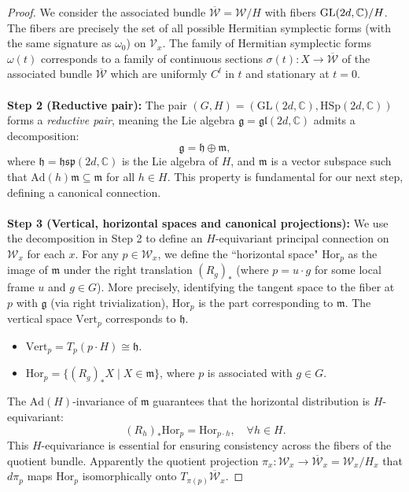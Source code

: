 \documentclass[11pt]{amsart}
\theoremstyle{remark}
\theoremstyle{definition}
\newcommand{\C}{{\mathbf C}}
\newcommand{\V}{{\mathbf V}}
\newcommand{\W}{{\mathbf W}}
\newcommand{\GL}{{\rm GL}}
\def \W{{\mathcal W}}
\def \C{{\mathcal{C}}}
\def \W{\mathcal{W}}
\def \V{\mathcal{V}}
\def\C{{\mathbb C}}
\begin{document}
\begin{proof}
We consider the associated bundle $\overline{\mathcal{W}} = \mathcal{W} / H$ with fibers $\GL(2d,\C)/H$. The fibers are precisely the set of all possible Hermitian symplectic forms (with the same signature as $\omega_0$) on $\V_x$. 
The family of Hermitian symplectic forms $\omega(t)$ corresponds to a family of continuous sections $\sigma(t): X \to \overline{\mathcal{W}}$ of the associated bundle $\overline{\W}$ which are uniformly $C^l$ in $t$ and stationary at $t=0$. 
\\
\\ \textbf{Step 2 (Reductive pair): } The pair $(G, H) = (\text{GL}(2d, \mathbb{C}), \text{HSp}(2d, \mathbb{C}))$ forms a \textit{reductive pair}, meaning the Lie algebra $\mathfrak{g} = \mathfrak{gl}(2d, \mathbb{C})$ admits a decomposition:
\[
\mathfrak{g} = \mathfrak{h} \oplus \mathfrak{m},
\]
where $\mathfrak{h} = \mathfrak{hsp}(2d, \mathbb{C})$ is the Lie algebra of $H$, and $\mathfrak{m}$ is a vector subspace such that $\text{Ad}(h) \mathfrak{m} \subseteq \mathfrak{m}$ for all $h \in H$. This property is fundamental for our next step, defining a canonical connection.
\\
\\ \textbf{Step 3 (Vertical, horizontal spaces and canonical projections):} We use the decomposition in Step 2 to define an $H$-equivariant principal connection on $\mathcal{W}_x$ for each $x$. For any $p \in \mathcal{W}_x$, we define the ``horizontal space" $\text{Hor}_p$ as the image of $\mathfrak{m}$ under the right translation $(R_g)_*$ (where $p = u \cdot g$ for some local frame $u$ and $g \in G$). More precisely, identifying the tangent space to the fiber at $p$ with $\mathfrak{g}$ (via right trivialization), $\text{Hor}_p$ is the part corresponding to $\mathfrak{m}$. The vertical space $\text{Vert}_p$ corresponds to $\mathfrak{h}$.
\begin{itemize}
    \item $\text{Vert}_p = T_p (p \cdot H) \cong \mathfrak{h}$.
    \item $\text{Hor}_p = \{ (R_g)_* X \mid X \in \mathfrak{m} \}$, where $p$ is associated with $g \in G$.
\end{itemize}
The $\text{Ad}(H)$-invariance of $\mathfrak{m}$ guarantees that the horizontal distribution is $H$-equivariant:
\[
(R_h)_* \text{Hor}_p = \text{Hor}_{p \cdot h}, \quad \forall h \in H.
\]
This $H$-equivariance is essential for ensuring consistency across the fibers of the quotient bundle. Apparently the quotient projection $\pi_x: \mathcal{W}_x \to \overline{\mathcal{W}}_x = \mathcal{W}_x/H_x$  that $d\pi_p$ maps $\text{Hor}_p$ isomorphically onto $T_{\pi(p)}\overline{\mathcal{W}}_x$. 

\end{proof}
\end{document}
